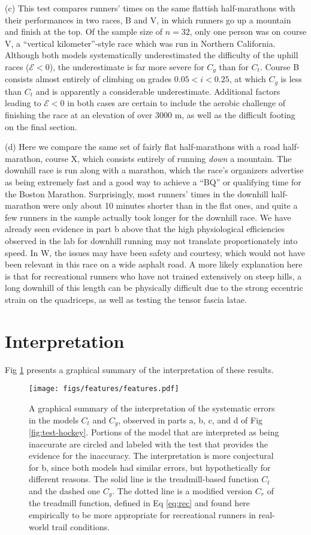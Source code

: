 \documentclass[10pt,letterpaper]{article}
\begin{document}
(c) This test compares runners' times on the same flattish half-marathons with their performances in
two races, B and V, in which runners go up a mountain and finish at the top. Of the sample size of $n=32$, only
one person was on course V, a ``vertical kilometer''-style race which was run in Northern California.
Although both models systematically underestimated the difficulty of the uphill races ($\mathcal{E}<0$),
the underestimate is far more severe for $C_g$ than for $C_t$. Course B consists almost
entirely of climbing on grades $0.05<i<0.25$, at which $C_g$ is less than $C_t$ and is apparently a
considerable underestimate. Additional factors leading to $\mathcal{E}<0$ in both cases
are certain to include the aerobic challenge of finishing the race at an elevation of over 3000 m,
as well as the difficult footing on the final section.

(d) Here we compare the same set of fairly flat half-marathons with a road half-marathon, course X,
which consists entirely
of running \emph{down} a mountain. The downhill race is run along with a marathon, which
the race's organizers advertise as being extremely fast and a good way to achieve a ``BQ'' or
qualifying time for the Boston Marathon. Surprisingly, most runners' times in the downhill
half-marathon were only about 10 minutes shorter than in the flat ones, and quite a few runners in
the sample actually took longer for the downhill race. We have already seen evidence in part
b above that the high physiological efficiencies observed in the lab for downhill running may
not translate proportionately into speed. In W, the issues may have been safety and courtesy,
which would not have been relevant in this race on a wide asphalt road. A more likely explanation
here is that for recreational runners who have not trained extensively on steep hills, a long downhill of this
length can be physically difficult due to the strong eccentric strain on the quadriceps, as well as
testing the tensor fascia latae.

\section{Interpretation}

Fig \ref{fig:features} presents a graphical summary of the interpretation of these results.

\begin{figure}[h]
\texttt{[image: figs/features/features.pdf]}
\centering
\caption{A graphical summary of the interpretation of the systematic errors in the models $C_t$ and $C_g$, observed
in parts a, b, c, and d of Fig \ref{fig:test-hockey}. Portions of the model that are
interpreted as being inaccurate are circled and labeled with the test that provides the
evidence for the inaccuracy. The interpretation is more conjectural for b, since both
models had similar errors, but hypothetically for different reasons.
The solid line is the treadmill-based function $C_t$ and the dashed one $C_g$.
The dotted line is a modified version $C_r$ of the treadmill function, defined in Eq \ref{eq:rec} and found
here empirically to be more appropriate for recreational runners in real-world trail conditions.}
\label{fig:features}
\end{figure}
\end{document}
